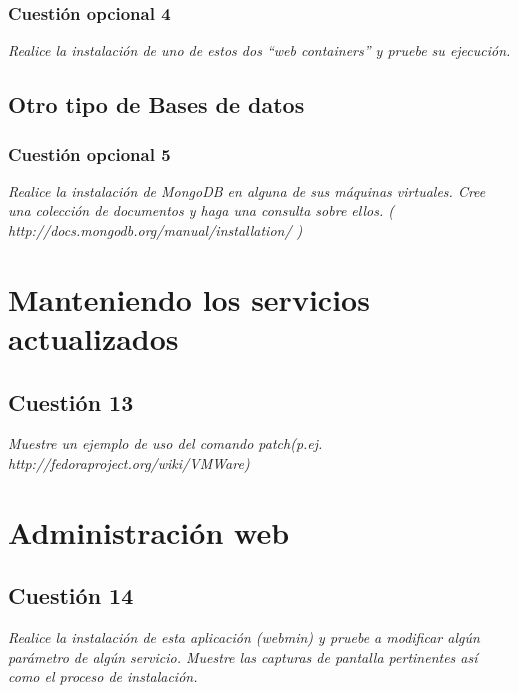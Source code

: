 \subsubsection{Cuestión opcional 4}
\textit{Realice la instalación de uno de estos dos “web containers” y pruebe su ejecución.}


\subsection{Otro tipo de Bases de datos}
\subsubsection{Cuestión opcional 5}
\textit{Realice la instalación de MongoDB en alguna de sus máquinas virtuales. Cree una colección de documentos y haga una consulta sobre ellos. ( http://docs.mongodb.org/manual/installation/ )}


\section{Manteniendo los servicios actualizados}
\subsection{Cuestión 13}
\textit{Muestre un ejemplo de uso del comando patch(p.ej. http://fedoraproject.org/wiki/VMWare)}
\newline


\section{Administración web}
\subsection{Cuestión 14}
\textit{Realice la instalación de esta aplicación (webmin) y pruebe a modificar algún parámetro de algún servicio. Muestre las capturas de pantalla pertinentes así como el proceso de instalación.}
\newline


